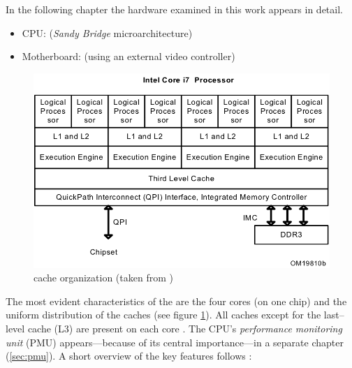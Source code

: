 \label{sec:technical-prerequisites}

In the following chapter the hardware examined in this work appears in detail.


\label{sec:hw-products}

\begin{itemize}

\item CPU: \JWPLcpu{} (\emph{Sandy Bridge}\cite{wiki:snb} microarchitecture)

\item Motherboard: \JWPLboard{} (using an external video controller)

\end{itemize}


\label{sec:sandy-bridge}

\begin{figure}
  \centering
    \includegraphics[width=\textwidth]{fig/intel-cache-orga.png}
  \caption{\JWPcpu{} cache organization (taken from \cite{intel2011softdev1})}
  \label{fig:cache-orga}
\end{figure}

The most evident characteristics of the \JWPcpu{} are the four cores (on one
chip) and the uniform distribution of the caches (see figure
\ref{fig:cache-orga}). All caches except for the last--level cache (L3) are
present on each core \cite{fog11}. The CPU's \emph{performance monitoring unit}
(PMU) appears---because of its central importance---in a separate chapter
(\ref{sec:pmu}). A short overview of the key features follows
\cite{intel2011spec}:

